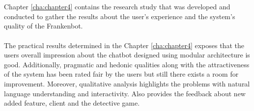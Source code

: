 \\~\\
Chapter \ref{cha:chapter4} contains the research study that was developed and conducted to gather the results about the user's experience and the system's quality of the Frankenbot.
\\~\\
The practical results determined in the Chapter \ref{cha:chapter4} exposes that the users overall impression about the chatbot designed using modular architecture is good. Additionally, pragmatic and hedonic qualities along with the attractiveness of the system has been rated fair by the users but still there exists a room for improvement. Moreover, qualitative analysis highlights the problems with natural language understanding and interactivity. Also provides the feedback about new added feature, client and the detective game.

